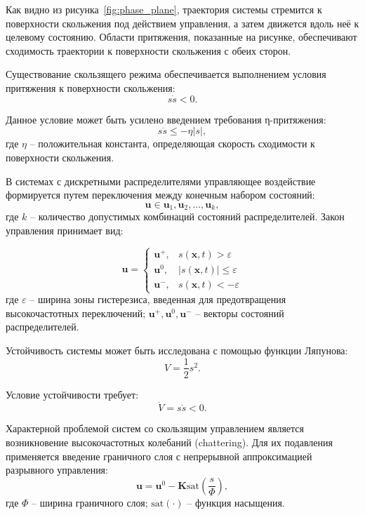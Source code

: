 Как видно из рисунка~\ref{fig:phase_plane}, траектория системы стремится к поверхности скольжения под действием управления,
а затем движется вдоль неё к целевому состоянию. Области притяжения, показанные на рисунке,
обеспечивают сходимость траектории к поверхности скольжения с обеих сторон.

Существование скользящего режима обеспечивается выполнением условия притяжения к поверхности скольжения:
\begin{equation*}
s\dot{s} < 0.
\end{equation*}

Данное условие может быть усилено введением требования η-притяжения:
\begin{equation*}
s\dot{s} \leq -\eta|s|,
\end{equation*}
где $\eta$ -- положительная константа, определяющая скорость сходимости к поверхности скольжения.

В системах с дискретными распределителями управляющее воздействие формируется путем переключения между конечным набором состояний:
\begin{equation*}
\mathbf{u} \in {\mathbf{u}_1, \mathbf{u}_2, ..., \mathbf{u}_k},
\end{equation*}
где $k$ -- количество допустимых комбинаций состояний распределителей. Закон управления принимает вид:

\begin{equation*}
\mathbf{u} = \begin{cases}
\mathbf{u}^+, & s(\mathbf{x}, t) > \varepsilon \\
\mathbf{u}^0, & |s(\mathbf{x}, t)| \leq \varepsilon \\
\mathbf{u}^-, & s(\mathbf{x}, t) < -\varepsilon
\end{cases}
\end{equation*}
где $\varepsilon$ -- ширина зоны гистерезиса, введенная для предотвращения высокочастотных переключений;
$\mathbf{u}^+, \mathbf{u}^0, \mathbf{u}^-$ -- векторы состояний распределителей.

Устойчивость системы может быть исследована с помощью функции Ляпунова:
\begin{equation*}
V = \frac{1}{2}s^2.
\end{equation*}

Условие устойчивости требует:
\begin{equation*}
\dot{V} = s\dot{s} < 0.
\end{equation*}

Характерной проблемой систем со скользящим управлением является возникновение высокочастотных колебаний
(chattering). Для их подавления применяется введение граничного слоя с непрерывной аппроксимацией разрывного управления:
\begin{equation*}
\mathbf{u} = \mathbf{u}^0 - \mathbf{K}\text{sat}\left(\frac{s}{\Phi}\right),
\end{equation*}
где $\Phi$ -- ширина граничного слоя; $\text{sat}(\cdot)$ -- функция насыщения.

